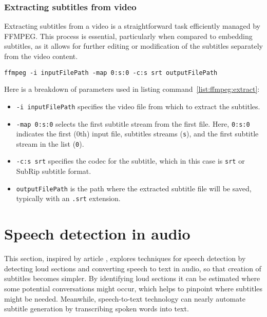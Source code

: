 \subsubsection{Extracting subtitles from video}
\label{theory:ffmpeg:extracting-subtitles}

Extracting subtitles from a video is a straightforward task efficiently managed by FFMPEG. This process is essential, particularly when compared to embedding subtitles, as it allows for further editing or modification of the subtitles separately from the video content.

\begin{clisting} 
\label{list:ffmpeg:extract}
\begin{verbatim}
ffmpeg -i inputFilePath -map 0:s:0 -c:s srt outputFilePath
\end{verbatim}
\end{clisting}

\noindent Here is a breakdown of parameters used in listing command~\ref{list:ffmpeg:extract}:
\begin{itemize}
\item \texttt{-i inputFilePath} specifies the video file from which to extract the subtitles.
\item \texttt{-map 0:s:0} selects the first subtitle stream from the first file. Here, \texttt{0:s:0} indicates the first (0th) input file, subtitles streams (\texttt{s}), and the first subtitle stream in the list (\texttt{0}).
\item \texttt{-c:s srt} specifies the codec for the subtitle, which in this case is \texttt{srt} or SubRip subtitle format.
\item \texttt{outputFilePath} is the path where the extracted subtitle file will be saved, typically with an \texttt{.srt} extension.
\end{itemize}

\section{Speech detection in audio}
This section, inspired by article \cite{Nunes2021AnomalousSound}, explores techniques for speech detection by detecting loud sections and converting speech to text in audio, so that creation of subtitles becomes simpler. By identifying loud sections it can be estimated where some potential conversations might occur, which helps to pinpoint where subtitles might be needed. Meanwhile, speech-to-text technology can nearly automate subtitle generation by transcribing spoken words into text.

